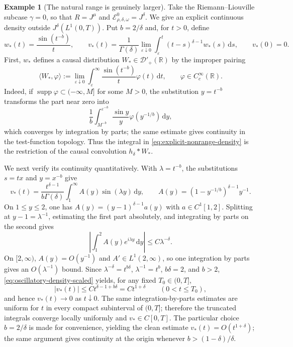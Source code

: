 \documentclass[11pt]{article}
\numberwithin{equation}{section}
\theoremstyle{definition}
\newtheorem{example}{Example}
\theoremstyle{remark}
\newcommand{\R}{\mathbb R}
\newcommand{\D}{\mathcal D}
\newcommand{\E}{\mathcal E}
\newcommand{\dd}{\,\mathrm d}
\newcommand{\supp}{\operatorname{supp}}
\begin{document}
\begin{example}[The natural range is genuinely larger]\label{ex:strict-natural-range}
Take the Riemann--Liouville subcase $\gamma=0$, so that
$R=J^\mu$ and
$\E_{\rho,\delta,\omega}^{0}=J^\delta$.  We give an explicit continuous
density outside $J^\delta(L^1(0,T))$.  Put $b=2/\delta$ and, for $t>0$, define
\begin{equation}
w_*(t)=\frac{\sin(t^{-b})}{t},
\qquad
v_*(t)=\frac{1}{\Gamma(\delta)}
\lim_{\varepsilon\downarrow0}
\int_{\varepsilon}^{t}(t-s)^{\delta-1}w_*(s)\dd s,
\qquad v_*(0)=0.
\label{eq:explicit-nonrange-density}
\end{equation}
First, $w_*$ defines a causal distribution $W_*\in\D'_+(\R)$ by the
improper pairing
\begin{equation*}
\langle W_*,\varphi\rangle
:=\lim_{\varepsilon\downarrow0}
\int_\varepsilon^\infty \frac{\sin(t^{-b})}{t}\varphi(t)\dd t,
\qquad \varphi\in C_c^\infty(\R).
\end{equation*}
Indeed, if $\supp\varphi\subset(-\infty,M]$ for some $M>0$, the substitution $y=t^{-b}$
transforms the part near zero into
\begin{equation*}
\frac1b\int_{M^{-b}}^{\varepsilon^{-b}}
\frac{\sin y}{y}\varphi(y^{-1/b})\dd y,
\end{equation*}
which converges by integration by parts; the same estimate gives continuity
in the test-function topology.  Thus the integral in
\eqref{eq:explicit-nonrange-density} is the restriction of the causal
convolution $h_\delta*W_*$.

We next verify its continuity quantitatively.  With $\lambda=t^{-b}$, the
substitutions $s=tx$ and $y=x^{-b}$ give
\begin{equation}
v_*(t)=\frac{t^{\delta-1}}{b\Gamma(\delta)}
\int_1^\infty A(y)\sin(\lambda y)\dd y,
\qquad
A(y)=(1-y^{-1/b})^{\delta-1}y^{-1}.
\label{eq:oscillatory-density-scaled}
\end{equation}
On $1\le y\le2$, one has
$A(y)=(y-1)^{\delta-1}a(y)$ with $a\in C^1[1,2]$.  Splitting at
$y-1=\lambda^{-1}$, estimating the first part absolutely, and integrating
by parts on the second gives
\begin{equation*}
\left|\int_1^2A(y)e^{i\lambda y}\dd y\right|
\le C\lambda^{-\delta}.
\end{equation*}
On $[2,\infty)$, $A(y)=O(y^{-1})$ and $A'\in L^1(2,\infty)$, so one
integration by parts gives an $O(\lambda^{-1})$ bound.  Since
$\lambda^{-\delta}=t^{b\delta}$, $\lambda^{-1}=t^b$, $b\delta=2$, and
$b>2$, \eqref{eq:oscillatory-density-scaled} yields, for any fixed
$T_0\in(0,T]$,
\begin{equation*}
|v_*(t)|\le C t^{\delta-1+b\delta}=C t^{1+\delta}
\qquad (0<t\le T_0),
\end{equation*}
and hence $v_*(t)\to0$ as $t\downarrow0$.  The same integration-by-parts
estimates are uniform for $t$ in every compact subinterval of $(0,T]$;
therefore the truncated integrals converge locally uniformly and
$v_*\in C[0,T]$.
The particular choice $b=2/\delta$ is made for convenience, yielding the
clean estimate $v_*(t)=O(t^{1+\delta})$; the same argument gives continuity
at the origin whenever $b>(1-\delta)/\delta$.


\end{example}
\end{document}
